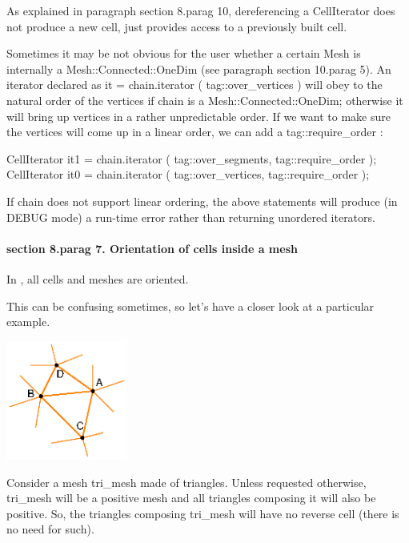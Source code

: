 As explained in paragraph \numb section 8.\numb parag 10, dereferencing a {\codett CellIterator}
does not produce a new cell, just provides access to a previously built cell.

Sometimes it may be not obvious for the user whether a certain {\codett Mesh} is internally a
{\codett Mesh::Connected::OneDim} (see paragraph \numb section 10.\numb parag 5).
An iterator declared as {\codett it = chain.iterator ( tag::over\_vertices )}
will obey to the natural order of the vertices if {\codett chain} is a\break
{\codett Mesh::Connected::OneDim}; otherwise it will bring up vertices in a rather unpredictable
order.
If we want to make sure the vertices will come up in a linear order, we can add a
{\codett tag::require\_order} :

\verbatim
   CellIterator it1 = chain.iterator ( tag::over_segments, tag::require_order );
   CellIterator it0 = chain.iterator ( tag::over_vertices, tag::require_order );
\endverbatim

If {\codett chain} does not support linear ordering, the above statements will produce
(in {\codett DEBUG} mode) a run-time error rather than returning unordered iterators.


\paragraph{\numb section 8.\numb parag 7. Orientation of cells inside a mesh}

In \maniFEM, all cells and meshes are oriented.

This can be confusing sometimes, so let's have a closer look at a particular example.

{ 
\centerline{\includegraphics[width=4cm]{malha-tri.eps}} }

Consider a mesh {\codett tri\_mesh} made of triangles.
Unless requested otherwise, {\codett tri\_mesh} will be a positive mesh and all triangles
composing it will also be positive.
So, the triangles composing {\codett tri\_mesh} will have no reverse cell
(there is no need for such).

